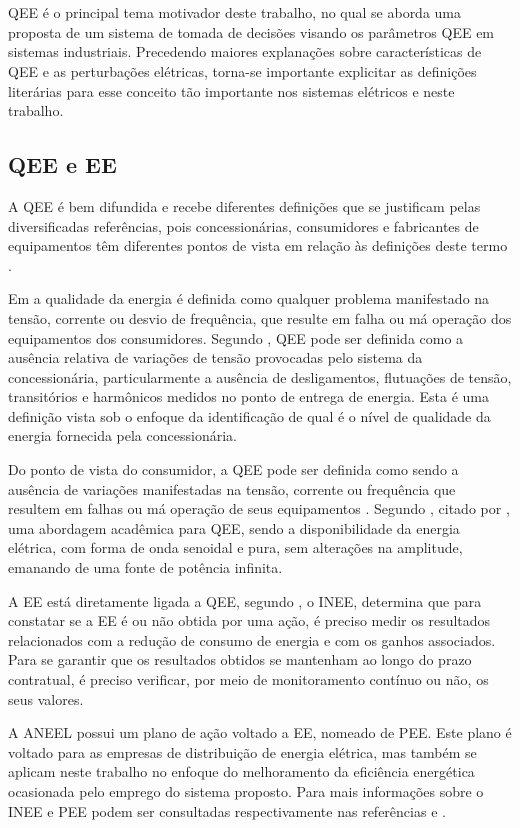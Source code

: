 \chapter{\capdois}\label{qeeDIS}
\acl{QEE} é o principal tema motivador deste trabalho, no qual se aborda uma proposta de um sistema de tomada de decisões visando os parâmetros \ac{QEE} em sistemas industriais. Precedendo maiores explanações sobre características de \ac{QEE} e as perturbações elétricas, torna-se importante explicitar as definições literárias para esse conceito tão importante nos sistemas elétricos e neste trabalho.

\section{QEE e EE}\label{qeeEE}
\par 
A \ac{QEE} é bem difundida e recebe diferentes definições que se justificam pelas diversificadas referências, pois concessionárias, consumidores e fabricantes de equipamentos têm diferentes pontos de vista em relação às definições deste termo \cite{FER99}.
\par 
Em \cite{DUG96} a qualidade da energia é definida como qualquer problema manifestado na tensão, corrente ou desvio de frequência, que resulte em falha ou má operação dos equipamentos dos consumidores. Segundo \cite{FER99}, \ac{QEE} pode ser definida como a ausência relativa de variações de tensão provocadas pelo sistema da concessionária, particularmente a ausência de desligamentos, flutuações de tensão, transitórios e harmônicos medidos no ponto de entrega de energia. Esta é uma definição vista sob o enfoque da identificação de qual é o nível de qualidade da energia fornecida pela concessionária.
\par
Do ponto de vista do consumidor, a \ac{QEE} pode ser definida como sendo a ausência de variações manifestadas na tensão, corrente ou frequência que resultem em falhas ou má operação de seus equipamentos \cite{DUG96}.
Segundo \cite{SBQEE}, citado por \cite{FER99}, uma abordagem acadêmica para \ac{QEE}, sendo a disponibilidade da energia elétrica, com forma de onda senoidal e pura, sem alterações na amplitude, emanando de uma fonte de potência infinita. 
\par 
A \acl{EE} está diretamente ligada a \ac{QEE}, segundo \cite{INE12}, o \ac{INEE}, determina que para constatar se a \ac{EE} é ou não obtida por uma ação, é preciso medir os resultados relacionados com a redução de consumo de energia e com os ganhos associados. Para se garantir que os resultados obtidos se mantenham ao longo do prazo contratual, é preciso verificar, por meio de monitoramento contínuo ou não, os seus valores.
\par
A \ac{ANEEL} possui um plano de ação voltado a \ac{EE}, nomeado de \ac{PEE}. Este plano é voltado para as empresas de distribuição de energia elétrica, mas também se aplicam neste trabalho no enfoque do melhoramento da eficiência energética ocasionada pelo emprego do sistema proposto. Para mais informações sobre o \ac{INEE} e \ac{PEE} podem ser consultadas respectivamente nas referências \cite{INE12} e \cite{ANEE3}.

